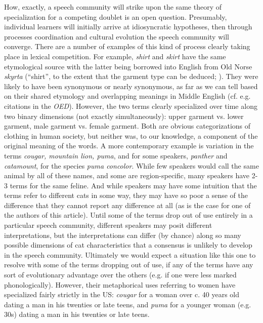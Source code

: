 How, exactly, a speech community will strike upon the same theory of specialization for a competing doublet is an open question.
Presumably, individual learners will initially arrive at idiosyncratic hypotheses, then through processes coordination  and cultural evolution \citep{kirby.cornish.smith2008} the speech community will converge. 
There are a number of examples of this kind of process clearly taking place in lexical competition.
For example, \textsl{shirt} and \textsl{skirt} have the same etymological source with the latter being borrowed into English from Old Norse \textsl{skyrta} (``shirt'', to the extent that the garment type can be deduced; \citealt{cleasbyvigfusson}).
They were likely to have been synonymous or nearly synonymous, as far as we can tell based on their shared etymology and overlapping meanings in Middle English (cf. e.g. citations in the \textsl{OED}).
However, the two terms clearly specialized over time along two binary dimensions (not exactly simultaneously): upper garment vs. lower garment, male garment vs. female garment.
Both are obvious categorizations of clothing in human society, but neither was, to our knowledge, a component of the original meaning of the words.
A more contemporary example is variation in the terms \textsl{cougar, mountain lion, puma}, and for some speakers, \textsl{panther} and \textsl{catamount}, for the species \textsl{puma concolor}.
While few speakers would call the same animal by all of these names, and some are region-specific, many speakers have 2-3 terms for the same feline.
And while speakers may have some intuition that the terms refer to different cats in some way, they may have so poor a sense of the difference that they cannot report any difference at all (as is the case for one of the authors of this article).
Until some of the terms drop out of use entirely in a particular speech community, different speakers may posit different interpretations, but the interpretations can differ (by chance) along so many possible dimensions of cat characteristics that a consensus is unlikely to develop in the speech community.
Ultimately we would expect a situation like this one to resolve with some of the terms dropping out of use, if any of the terms have any sort of evolutionary advantage over the others (e.g. if one were less marked phonologically).
However, their metaphorical uses referring to women have specialized fairly strictly in the US: \textsl{cougar} for a woman over c. 40 years old dating a man in his twenties or late teens, and \textsl{puma} for a younger woman (e.g. 30s) dating a man in his twenties or late teens.

